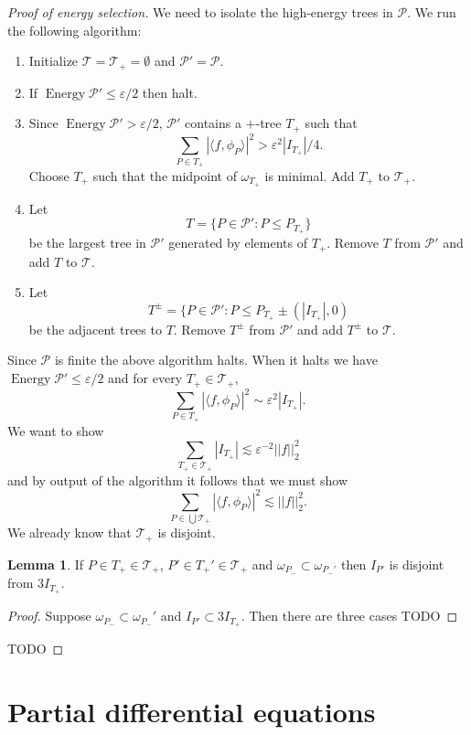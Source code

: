 \documentclass[12pt]{report}
\DeclareMathOperator*{\Energy}{Energy}
\theoremstyle{definition}
\newtheorem{lemma}[theorem]{Lemma}
\begin{document}
\begin{proof}[Proof of energy selection]
We need to isolate the high-energy trees in $\mathcal P$. We run the following algorithm:
\begin{enumerate}
\item Initialize $\mathcal T = \mathcal T_+ = \emptyset$ and $\mathcal P' = \mathcal P$.
\item If $\Energy \mathcal P' \leq \varepsilon/2$ then halt.
\item Since $\Energy \mathcal P' > \varepsilon/2$, $\mathcal P'$ contains a $+$-tree $T_+$ such that
$$\sum_{P \in T_+} |\langle f, \phi_P\rangle|^2 > \varepsilon^2|I_{T_+}|/4.$$
Choose $T_+$ such that the midpoint of $\omega_{T_+}$ is minimal. Add $T_+$ to $\mathcal T_+$.
\item Let
$$T = \{P \in \mathcal P': P \leq P_{T_+}\}$$
be the largest tree in $\mathcal P'$ generated by elements of $T_+$. Remove $T$ from $\mathcal P'$ and add $T$ to $\mathcal T$.
\item Let
$$T^\pm = \{P \in \mathcal P': P \leq P_{T_+} \pm (|I_{T_+}|, 0)$$
be the adjacent trees to $T$. Remove $T^\pm$ from $\mathcal P'$ and add $T^\pm$ to $\mathcal T$.
\end{enumerate}
Since $\mathcal P$ is finite the above algorithm halts. When it halts we have $\Energy \mathcal P' \leq \varepsilon/2$ and for every $T_+ \in \mathcal T_+$,
$$\sum_{P \in T_+} |\langle f, \phi_P\rangle|^2 \sim \varepsilon^2 |I_{T_+}|.$$
We want to show
$$\sum_{T_+ \in \mathcal T_+} |I_{T_+}| \lesssim \varepsilon^{-2} ||f||_2^2$$
and by output of the algorithm it follows that we must show
$$\sum_{P \in \bigcup \mathcal T_+} |\langle f, \phi_P\rangle|^2 \lesssim ||f||_2^2.$$
We already know that $\mathcal T_+$ is disjoint.
\begin{lemma}
If $P \in T_+ \in \mathcal T_+$, $P' \in T_+' \in \mathcal T_+$ and $\omega_{P_-} \subset \omega_{P_-'}$ then $I_{P'}$ is disjoint from $3I_{T_+}$.
\end{lemma}
\begin{proof}
Suppose $\omega_{P_-} \subset \omega_{P_-}'$ and $I_{P'} \subset 3I_{T_+}$. Then there are three cases TODO
\end{proof}
TODO

\end{proof}



\part{Partial differential equations}
\end{document}
